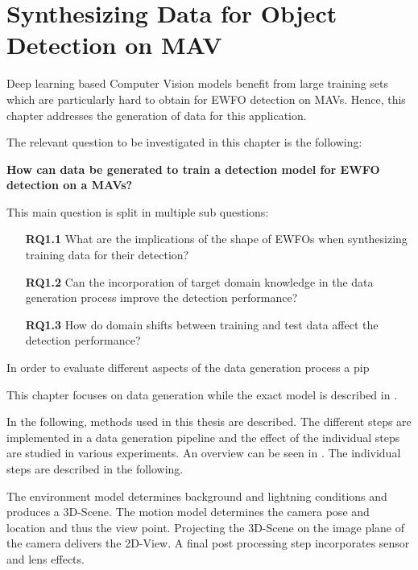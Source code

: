 \chapter{Synthesizing Data for Object Detection on \ac{MAV}}
\label{sec:training}

Deep learning based Computer Vision models benefit from large training sets which are particularly hard to obtain for \ac{EWFO} detection on \acp{MAV}. Hence, this chapter addresses the generation of data for this application. 

The relevant question to be investigated in this chapter is the following:

\textbf{How can data be generated to train a detection model for \ac{EWFO} detection on a \acp{MAV}?} 

This main question is split in multiple sub questions:
\begin{enumerate}
	\item[\textbf{RQ1.1}] What are the implications of the shape of \acp{EWFO} when synthesizing training data for their detection?
	\item[\textbf{RQ1.2}] Can the incorporation of target domain knowledge in the data generation process improve the detection performance?
	\item[\textbf{RQ1.3}] How do domain shifts between training and test data affect the detection performance?
\end{enumerate}

In order to evaluate different aspects of the data generation process a pip

This chapter focuses on data generation while the exact model is described in .


In the following, methods used in this thesis are described. The different steps are implemented in a data generation pipeline and the effect of the individual steps are studied in various experiments. An overview can be seen in . The individual steps are described in the following.

The environment model determines background and lightning conditions and produces a 3D-Scene. The motion model determines the camera pose and location and thus the view point. Projecting the 3D-Scene on the image plane of the camera delivers the 2D-View. A final post processing step incorporates sensor and lens effects.


